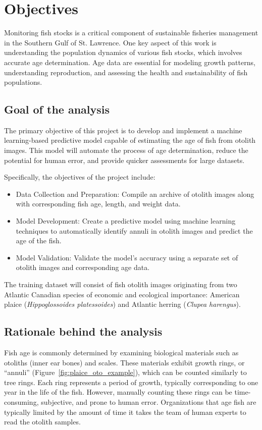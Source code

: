
\section{Objectives}

Monitoring fish stocks is a critical component of sustainable fisheries management in the Southern Gulf of St. Lawrence. One key aspect of this work is understanding the population dynamics of various fish stocks, which involves accurate age determination. Age data are essential for modeling growth patterns, understanding reproduction, and assessing the health and sustainability of fish populations.

\subsection{Goal of the analysis}

The primary objective of this project is to develop and implement a machine learning-based predictive model capable of estimating the age of fish from otolith images. This model will automate the process of age determination, reduce the potential for human error, and provide quicker assessments for large datasets.

Specifically, the objectives of the project include:

\begin{itemize}
    \item Data Collection and Preparation: Compile an archive of otolith images along with corresponding fish age, length, and weight data.
    \item Model Development: Create a predictive model using machine learning techniques to automatically identify annuli in otolith images and predict the age of the fish.
    \item Model Validation: Validate the model's accuracy using a separate set of otolith images and corresponding age data.
\end{itemize}

The training dataset will consist of fish otolith images originating from two Atlantic Canadian species of economic and ecological importance:
American plaice (\textit{Hippoglossoides platessoides}) and Atlantic herring (\textit{Clupea harengus}).


\subsection{Rationale behind the analysis}

Fish age is commonly determined by examining biological materials such as otoliths (inner ear bones) and scales.
These materials exhibit growth rings, or \enquote{annuli} (Figure~\ref{fig:plaice_oto_example}), which can be counted similarly to tree rings.
Each ring represents a period of growth, typically corresponding to one year in the life of the fish.
However, manually counting these rings can be time-consuming, subjective, and prone to human error.
Organizations that age fish are typically limited by the amount of time it takes the team of human experts to read the otolith samples.

